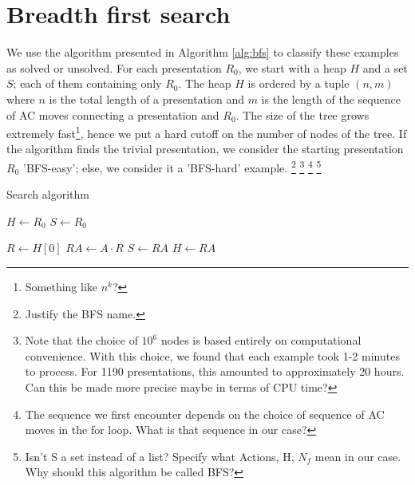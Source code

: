 
\section{Breadth first search}





We use the algorithm presented in Algorithm \autoref{alg:bfs} to classify these examples as solved or unsolved.
For each presentation $R_0$, we start with a heap $H$ and a set $S$; each of them containing only $R_0$.
The heap $H$ is ordered by a tuple $(n, m)$ where $n$ is the total length of a presentation and $m$ is the length of the sequence of AC moves connecting a presentation and $R_0$.
The size of the tree grows extremely fast\footnote{Something like $n^k$?}, hence we put a hard cutoff on the number of nodes of the tree.
If the algorithm finds the trivial presentation, we consider the starting presentation $R_0$ 'BFS-easy'; else, we consider it a 'BFS-hard' example.
\footnote{Justify the BFS name.}
\footnote{Note that the choice of $10^6$ nodes is based entirely on computational convenience.
With this choice, we found that each example took 1-2 minutes to process.
For 1190 presentations, this amounted to approximately 20 hours.
Can this be made more precise maybe in terms of CPU time?}
\footnote{The sequence we first encounter depends on the choice of sequence of AC moves in the for loop.
What is that sequence in our case?}
\footnote{Isn't S a set instead of a list? Specify what Actions, H, $N_f$ mean in our case.
Why should this algorithm be called BFS?}

\begin{algorithm}
	\caption{Search algorithm}\label{alg:bfs}
	\begin{algorithmic}
		\State $H \gets R_0$ 
		\State $S \gets R_0$ 

		 
		\State $R \gets H[0]$ 
		\State $RA \gets A \cdot R$ 
		\State $S \gets RA$
		\State $H \gets RA$ 

		\EndIf
		\EndFor
		\EndWhile
	\end{algorithmic}
\end{algorithm}

